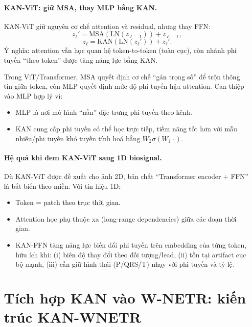 \documentclass[../DoAn.tex]{subfiles}
\begin{document}
\paragraph{KAN-ViT: giữ MSA, thay MLP bằng KAN.}
\cite{yeElevatingVisionTransformer2024}
KAN-ViT giữ nguyên cơ chế attention và residual, nhưng thay FFN:
\begin{equation}
  z_\ell' = \mathrm{MSA}(\mathrm{LN}(z_{\ell-1})) + z_{\ell-1},
\end{equation}
\begin{equation}
  z_\ell = \mathrm{KAN}(\mathrm{LN}(z_\ell')) + z_\ell'.
\end{equation}
Ý nghĩa: attention vẫn học quan hệ token-to-token (toàn cục), còn nhánh phi tuyến ``theo token'' được tăng năng lực bằng KAN.

Trong ViT/Transformer, MSA quyết định cơ chế ``gán trọng số'' để trộn thông tin giữa token, còn MLP quyết định mức độ phi tuyến hậu attention.
Can thiệp vào MLP hợp lý vì:
\begin{itemize}
  \item MLP là nơi mô hình ``nắn'' đặc trưng phi tuyến theo kênh.
  \item KAN cung cấp phi tuyến có thể học trực tiếp, tiềm năng tốt hơn với mẫu nhiễu/phi tuyến khó tuyến tính hoá bằng $W_2\sigma(W_1\cdot)$.
\end{itemize}

\paragraph{Hệ quả khi đem KAN-ViT sang 1D biosignal.}
Dù KAN-ViT được đề xuất cho ảnh 2D, bản chất ``Transformer encoder + FFN'' là bất biến theo miền. Với tín hiệu 1D:
\begin{itemize}
  \item Token = patch theo trục thời gian.
  \item Attention học phụ thuộc xa (long-range dependencies) giữa các đoạn thời gian.
  \item KAN-FFN tăng năng lực biến đổi phi tuyến trên embedding của từng token, hữu ích khi:
    (i) biên độ thay đổi theo đối tượng/lead,
    (ii) tồn tại artifact cục bộ mạnh,
    (iii) cần giữ hình thái (P/QRS/T) nhạy với phi tuyến và tỷ lệ.
\end{itemize}

\section{Tích hợp KAN vào W-NETR: kiến trúc KAN-WNETR}
\end{document}
